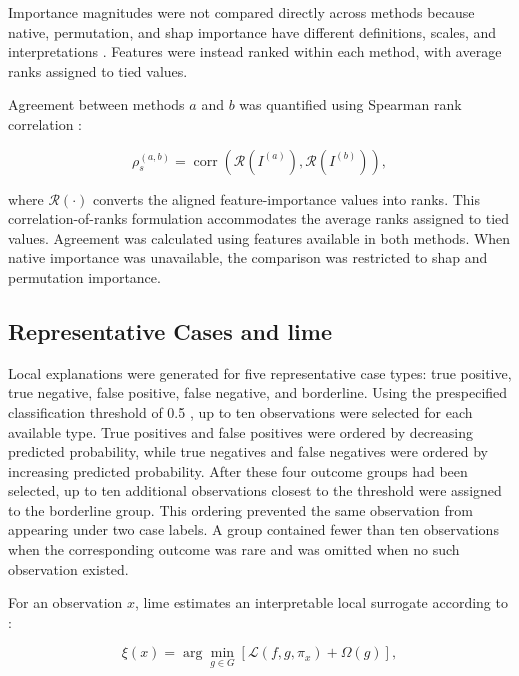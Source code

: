 Importance magnitudes were not compared directly across methods because native, permutation, and \gls{shap} importance have different definitions, scales, and interpretations \citep{linardatos_explainable_2020, vilone_classification_2021}. Features were instead ranked within each method, with average ranks assigned to tied values.

Agreement between methods $a$ and $b$ was quantified using Spearman rank correlation \citep{spearman_proof_1904}:

\begin{equation}
\rho_s^{(a,b)}
=
\operatorname{corr}
\left(
\mathcal{R}\left(I^{(a)}\right),
\mathcal{R}\left(I^{(b)}\right)
\right),
\end{equation}

where $\mathcal{R}(\cdot)$ converts the aligned feature-importance values into ranks. This correlation-of-ranks formulation accommodates the average ranks assigned to tied values. Agreement was calculated using features available in both methods. When native importance was unavailable, the comparison was restricted to \gls{shap} and permutation importance.

\subsection{Representative Cases and \gls{lime}}

Local explanations were generated for five representative case types: true positive, true negative, false positive, false negative, and borderline. Using the prespecified classification threshold of 0.5 \citep{hernandez-orallo_unified_2012}, up to ten observations were selected for each available type. True positives and false positives were ordered by decreasing predicted probability, while true negatives and false negatives were ordered by increasing predicted probability. After these four outcome groups had been selected, up to ten additional observations closest to the threshold were assigned to the borderline group. This ordering prevented the same observation from appearing under two case labels. A group contained fewer than ten observations when the corresponding outcome was rare and was omitted when no such observation existed.

For an observation $x$, \gls{lime} estimates an interpretable local surrogate according to \citet{ribeiro_why_2016}:

\begin{equation}
\xi(x)
=
\arg\min_{g\in G}
\left[
\mathcal{L}\left(f,g,\pi_x\right)
+
\Omega(g)
\right],
\end{equation}

